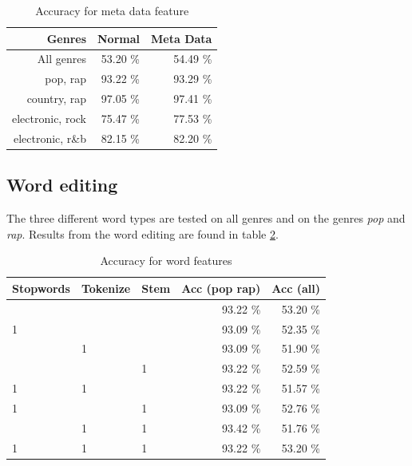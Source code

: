 \documentclass[a4paper, 12pt]{article}
\begin{document}
\begin{table}[h]
\begin{center}
    \begin{tabular}{| r | r | r |}
        \hline
        Genres & Normal & Meta Data \\
        \hline
        All genres & 53.20 \% & 54.49 \% \\

        pop, rap & 93.22 \% & 93.29 \% \\

        country, rap & 97.05 \% & 97.41 \% \\

        electronic, rock & 75.47 \% & 77.53 \% \\

        electronic, r\&b & 82.15 \% & 82.20 \% \\
        \hline
    \end{tabular}
    \caption{Accuracy for meta data feature}
    \label{tab:res-meta}
\end{center}
\end{table}

\subsection{Word editing}
The three different word types are tested on all genres and on the genres \textit{pop} and \textit{rap}.
Results from the word editing are found in table \ref{tab:res-words}.

\begin{table}[h]
\begin{center}
    \begin{tabular}{| l | l | l | r | r | }
        \hline
        Stopwords & Tokenize & Stem & Acc (pop rap) & Acc (all) \\
        \hline
          &   &   & 93.22 \% & 53.20 \% \\ \hline
        1 &   &   & 93.09 \% & 52.35 \% \\ \hline
          & 1 &   & 93.09 \% & 51.90 \% \\ \hline
          &   & 1 & 93.22 \% & 52.59 \% \\ \hline
        1 & 1 &   & 93.22 \% & 51.57 \% \\ \hline
        1 &   & 1 & 93.09 \% & 52.76 \% \\ \hline
          & 1 & 1 & 93.42 \% & 51.76 \% \\ \hline
        1 & 1 & 1 & 93.22 \% & 53.20 \% \\ \hline
    \end{tabular}
    \caption{Accuracy for word features}
    \label{tab:res-words}
\end{center}
\end{table}
\end{document}
